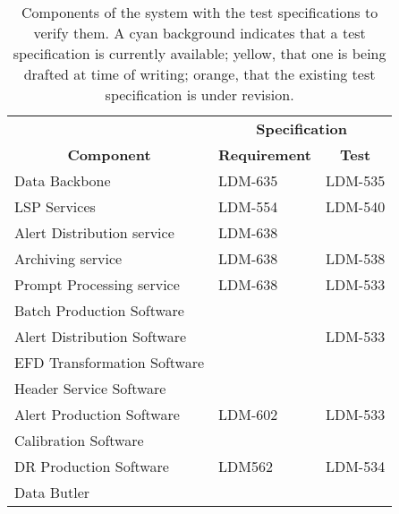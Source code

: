 \begin{longtable}{p{}p{}p{}}

\caption{Components of the \product{} system with the test specifications to verify them.
A cyan background indicates that a test specification is currently available; yellow, that one is being drafted at time of writing; orange, that the existing test specification is under revision.
\label{tab:testspecs}} \\

\hline
                                       & \multicolumn{2}{c}{\textbf{Specification}} \\
\multicolumn{1}{c}{\textbf{Component}} & \multicolumn{1}{c}{\textbf{Requirement}} & \multicolumn{1}{c}{\textbf{Test}} \\
\hline
Data Backbone                     & \cellcolor{dmorange} LDM-635 & \cellcolor{dmyellow} LDM-535 \\
LSP Services                      &   \cellcolor{dmblue} LDM-554 &   \cellcolor{dmblue} LDM-540 \\
Alert Distribution service        & \cellcolor{dmyellow} LDM-638 &                              \\
Archiving service                 & \cellcolor{dmyellow} LDM-638 &   \cellcolor{dmblue} LDM-538 \\
Prompt Processing service         & \cellcolor{dmyellow} LDM-638 &   \cellcolor{dmblue} LDM-533 \\
Batch Production Software         &                              &                              \\
Alert Distribution Software       &                              &   \cellcolor{dmblue} LDM-533 \\
EFD Transformation Software       &                              &                              \\
Header Service Software           &                              &                              \\
Alert Production Software         &   \cellcolor{dmblue} LDM-602 &   \cellcolor{dmblue} LDM-533 \\
Calibration Software              &                              &                              \\
DR Production Software            &    \cellcolor{dmblue} LDM562 &   \cellcolor{dmblue} LDM-534 \\
Data Butler                       &                              &                              \\

\end{longtable}
